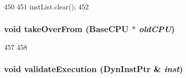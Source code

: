 \begin{DoxyCode}
450 {
451     instList.clear();
452 }
\end{DoxyCode}
\hypertarget{classChecker_ac82d2b8d331b2e8e6854a95d2917dfa2}{
\subsubsection[{takeOverFrom}]{\setlength{\rightskip}{0pt plus 5cm}void takeOverFrom ({\bf BaseCPU} $\ast$ {\em oldCPU})}}
\label{classChecker_ac82d2b8d331b2e8e6854a95d2917dfa2}



\begin{DoxyCode}
457 {
458 }
\end{DoxyCode}
\hypertarget{classChecker_ae48ab62afce87955bf9c238afb16e035}{
\subsubsection[{validateExecution}]{\setlength{\rightskip}{0pt plus 5cm}void validateExecution ({\bf DynInstPtr} \& {\em inst})}}
\label{classChecker_ae48ab62afce87955bf9c238afb16e035}



